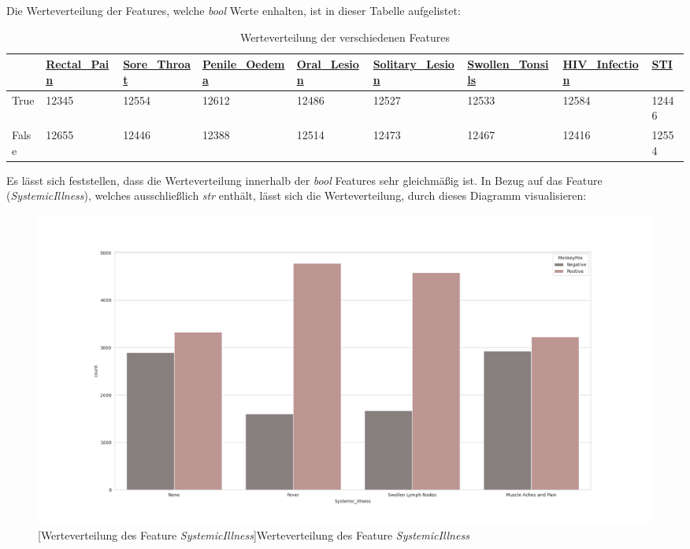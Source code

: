 \documentclass[13pt,a4paper, listof=entryprefix, bibliography=totocnumbered,toc=listofnumbered,lof=listofnumbered]{scrartcl}
\begin{document}
Die Werteverteilung der Features, welche \textit{bool} Werte enhalten, ist in dieser Tabelle aufgelistet: 
	
	\begin{singlespace}
	\begin{table}[H]
		\begin{adjustbox}{width=1\textwidth}
			\small
		\begin{tabular}{|l|l|l|l|l|l|l|l|l|}
			\hline  & \url{Rectal_Pain}&  \url{Sore_Throat}	& \url{Penile_Oedema} & \url{Oral_Lesion} & \url{Solitary_Lesion} &\url{Swollen_Tonsils} & \url{HIV_Infection} & \url{STI} \\
			\hline True & 12345 & 12554 & 12612 & 12486 & 12527 & 12533 & 12584  & 12446 \\
			\hline False & 12655 & 12446 & 12388& 12514 & 12473 & 12467 & 12416 & 12554\\
			\hline
		\end{tabular}
	\end{adjustbox}
		\caption{Werteverteilung der verschiedenen Features} %
		\label{tab:werteverteilung_features}
	\end{table}
\end{singlespace}
	

Es lässt sich feststellen, dass die Werteverteilung innerhalb der \textit{bool} Features sehr gleichmäßig ist. 
In Bezug auf das Feature (\textit{SystemicIllness}), welches ausschließlich \textit{str} enthält,  lässt sich die 
Werteverteilung, durch dieses Diagramm visualisieren: 

	\begin{figure}[H]
		\centering
		\includegraphics[width=0.8\linewidth]{Bilder/systemic_illness_plot.png}
		[Werteverteilung des Feature \textit{Systemic\textunderscore Illness}]{Werteverteilung des Feature \textit{Systemic\textunderscore Illness}}
		\label{fig:systemic_illness_plot}
	\end{figure}
\end{document}
